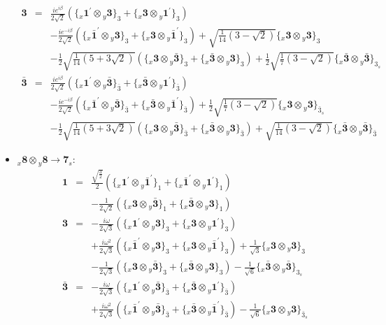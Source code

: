 \documentclass[english]{article}
\newcommand{\rep}[1]{\mathbf{#1}}
\newcommand{\repx}[2]{{}_{#2}\mathbf{#1}}
\newcommand{\subcg}[3]{\big\{ \repx{#1}{x}\otimes\repx{#2}{y}\big\}^{}_{#3}}
\begin{document}
\begin{itemize}
\begin{eqnarray*}
\rep{3} &=& \frac{i e^{i \beta }}{2 \sqrt{2}}\left(\subcg{1^{\prime}}{3}{3}+\subcg{3}{1^{\prime}}{3}\right) \\ 
 & & -\frac{i e^{-i \beta }}{2 \sqrt{2}}\left(\subcg{\bar{1}^{\prime}}{3}{3}+\subcg{3}{\bar{1}^{\prime}}{3}\right)+\sqrt{\frac{1}{14} \left(3-\sqrt{2}\right)}\subcg{3}{3}{3} \\ 
 & & -\frac{1}{2} \sqrt{\frac{1}{14} \left(5+3 \sqrt{2}\right)}\left(\subcg{3}{\bar{3}}{3}+\subcg{\bar{3}}{3}{3}\right)+\frac{1}{2} \sqrt{\frac{1}{7} \left(3-\sqrt{2}\right)}\subcg{\bar{3}}{\bar{3}}{3_{s}}
\\
\rep{\bar{3}} &=& \frac{i e^{i \beta }}{2 \sqrt{2}}\left(\subcg{1^{\prime}}{\bar{3}}{\bar{3}}+\subcg{\bar{3}}{1^{\prime}}{\bar{3}}\right) \\ 
 & & -\frac{i e^{-i \beta }}{2 \sqrt{2}}\left(\subcg{\bar{1}^{\prime}}{\bar{3}}{\bar{3}}+\subcg{\bar{3}}{\bar{1}^{\prime}}{\bar{3}}\right)+\frac{1}{2} \sqrt{\frac{1}{7} \left(3-\sqrt{2}\right)}\subcg{3}{3}{\bar{3}_{s}} \\ 
 & & -\frac{1}{2} \sqrt{\frac{1}{14} \left(5+3 \sqrt{2}\right)}\left(\subcg{3}{\bar{3}}{\bar{3}}+\subcg{\bar{3}}{3}{\bar{3}}\right)+\sqrt{\frac{1}{14} \left(3-\sqrt{2}\right)}\subcg{\bar{3}}{\bar{3}}{\bar{3}}
\end{eqnarray*}
\item $\repx{8}{x}\otimes\repx{8}{y}\to\rep{7}_{s}$:
\begin{eqnarray*}
\rep{1} &=& \frac{\sqrt{\frac{3}{2}}}{2}\left(\subcg{1^{\prime}}{\bar{1}^{\prime}}{1}+\subcg{\bar{1}^{\prime}}{1^{\prime}}{1}\right) \\ 
 & & -\frac{1}{2 \sqrt{2}}\left(\subcg{3}{\bar{3}}{1}+\subcg{\bar{3}}{3}{1}\right)
\\
\rep{3} &=& -\frac{i \omega }{2 \sqrt{3}}\left(\subcg{1^{\prime}}{3}{3}+\subcg{3}{1^{\prime}}{3}\right) \\ 
 & & +\frac{i \omega ^2}{2 \sqrt{3}}\left(\subcg{\bar{1}^{\prime}}{3}{3}+\subcg{3}{\bar{1}^{\prime}}{3}\right)+\frac{1}{\sqrt{3}}\subcg{3}{3}{3} \\ 
 & & -\frac{1}{2 \sqrt{3}}\left(\subcg{3}{\bar{3}}{3}+\subcg{\bar{3}}{3}{3}\right)-\frac{1}{\sqrt{6}}\subcg{\bar{3}}{\bar{3}}{3_{s}}
\\
\rep{\bar{3}} &=& -\frac{i \omega }{2 \sqrt{3}}\left(\subcg{1^{\prime}}{\bar{3}}{\bar{3}}+\subcg{\bar{3}}{1^{\prime}}{\bar{3}}\right) \\ 
 & & +\frac{i \omega ^2}{2 \sqrt{3}}\left(\subcg{\bar{1}^{\prime}}{\bar{3}}{\bar{3}}+\subcg{\bar{3}}{\bar{1}^{\prime}}{\bar{3}}\right)-\frac{1}{\sqrt{6}}\subcg{3}{3}{\bar{3}_{s}} \\ 

\end{eqnarray*}
\end{itemize}
\end{document}
